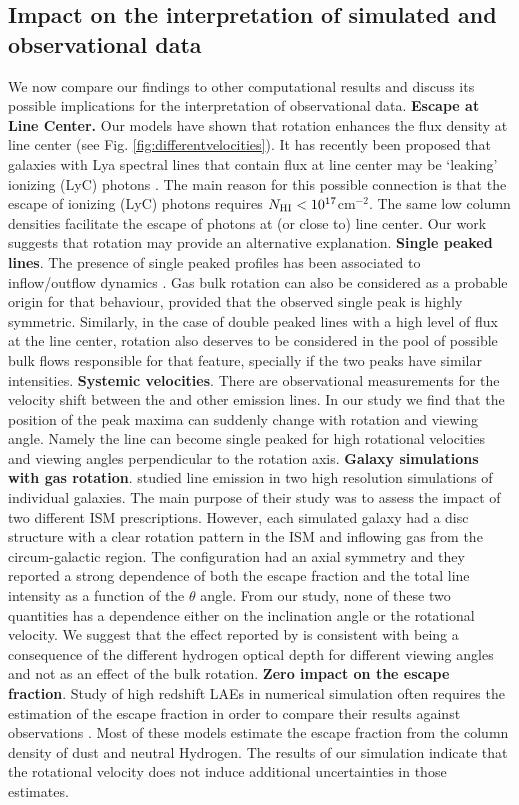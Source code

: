 \subsection{Impact on the interpretation of simulated and
observational data}
We now compare our findings to other computational results and discuss
its possible implications for the interpretation of observational data.
{\bf Escape at Line Center.} Our models have shown that rotation
enhances the flux density at line center (see Fig. \ref{fig:differentvelocities}). It has
recently been proposed that galaxies with Lya spectral lines that
contain flux at line center may be `leaking' ionizing (LyC) photons
\citep{Behrens2014,2014arXiv1404.2958V}. The main reason for this possible
connection is that the escape of ionizing (LyC) photons requires
$N_{\rm HI} < 10^{17} $cm$^{-2}$. The same low column densities facilitate the escape of
\ly photons at (or close to) line center. Our work suggests that
rotation may provide an alternative explanation.
{\bf Single peaked lines}. The presence of single peaked profiles has
been associated to inflow/outflow dynamics
\citep{Verhamme06,DijkstraKramer}.
Gas bulk rotation can also be considered as a probable origin for that
behaviour, provided that the observed single peak is highly
symmetric.
Similarly, in the case of double peaked lines with a high
level of flux at the line center, rotation also deserves to be
considered in the pool of possible bulk flows responsible for that feature,
specially if the two peaks have similar intensities.
{\bf Systemic velocities}. There are observational measurements for the
velocity shift between the \ly and other emission lines. In our study
we find that the position of the peak maxima can suddenly change with
rotation and viewing angle. Namely the line can become single peaked
for high rotational velocities and viewing angles perpendicular to the
rotation axis.
{\bf Galaxy simulations with gas rotation}. \cite{Verhamme12} studied \ly
line emission in two high resolution simulations of individual
galaxies.
The main purpose of their study was to assess the impact of two
different ISM prescriptions.
However, each simulated galaxy had a disc structure with a clear rotation pattern in
the ISM and inflowing gas from the circum-galactic region.
The configuration had an axial symmetry and they reported a strong dependence of both
the escape fraction and the total line intensity as a function of the
$\theta$ angle.
From our study, none of these two quantities has a dependence either
on the inclination angle or the rotational velocity.
We suggest that the effect reported by \cite{Verhamme12} is
consistent with being a consequence of the different hydrogen optical
depth for different viewing angles and not as an effect of the bulk
rotation.
{\bf Zero impact on the \ly escape fraction}. Study of
high redshift LAEs in numerical simulation often requires the
estimation of the \ly escape fraction in order to compare their
results against observations
\citep{CLARA,Dayal2012,Forero12,Orsi12,Garel2012}. Most of these
models estimate the escape fraction from the column density of dust and
neutral Hydrogen. The results of our simulation indicate that the
rotational velocity does not induce additional uncertainties in those
estimates.
